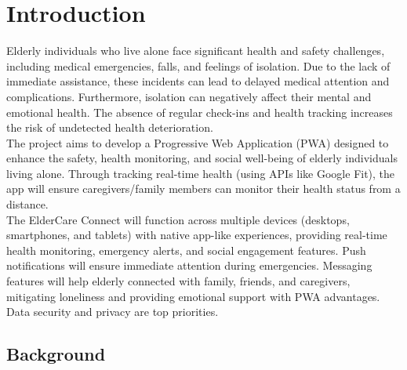 \chapter{Introduction}
Elderly individuals who live alone face significant health and safety challenges, including medical emergencies, falls, and feelings of isolation. Due to the lack of immediate assistance, these incidents can lead to delayed medical attention and complications. Furthermore, isolation can negatively affect their mental and emotional health. The absence of regular check-ins and health tracking increases the risk of undetected health deterioration.\\
The project aims to develop a Progressive Web Application (PWA) designed to enhance the safety, health monitoring, and social well-being of elderly individuals living alone. Through tracking real-time health (using APIs like Google Fit), the app will ensure caregivers/family members can monitor their health status from a distance.\\
The ElderCare Connect will function across multiple devices (desktops, smartphones, and tablets) with native app-like experiences, providing real-time health monitoring, emergency alerts, and social engagement features. Push notifications will ensure immediate attention during emergencies. Messaging features will help elderly connected with family, friends, and caregivers, mitigating loneliness and providing emotional support with PWA advantages. Data security and privacy are top priorities.

\section{Background}

